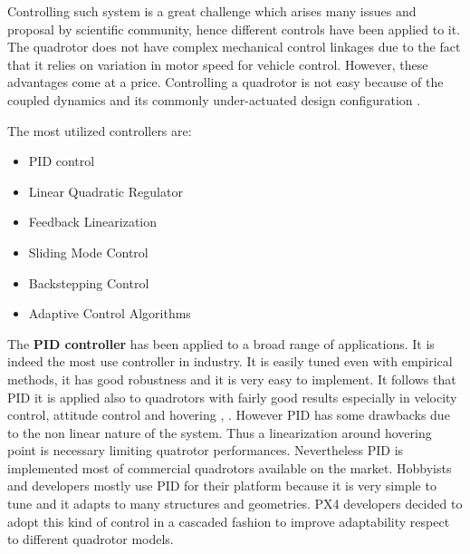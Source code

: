 \noindent
Controlling such system is a great challenge which arises many issues and proposal by scientific community, hence different controls have been applied to it. The quadrotor does not have complex mechanical control linkages due to the fact that it relies on variation in motor speed for vehicle control. However, these advantages come at a price. Controlling a quadrotor is not easy because of the coupled dynamics and its commonly under-actuated design configuration \cite{Algorithms2014}.
\par The most utilized controllers are: \begin{itemize}
\item PID control
\item Linear Quadratic Regulator
\item Feedback Linearization
\item Sliding Mode Control
\item Backstepping Control
\item Adaptive Control Algorithms
\end{itemize}
The \textbf{PID controller} has been applied to a broad range of applications. It is indeed the most use controller in industry. It is easily tuned even with empirical methods, it has good robustness and it is very easy to implement. It follows that PID it is applied also to quadrotors with fairly good results  especially in velocity control, attitude control and hovering \cite{Mahony2012}, \cite{Erginer2007}. However PID has some drawbacks due to the non linear nature of the system. Thus a linearization around hovering point is necessary \cite{Bouabdallah2} limiting quatrotor performances. Nevertheless PID is implemented most of commercial quadrotors available on the market. Hobbyists and developers mostly use PID for their platform because it is very simple to tune and it adapts to many structures and geometries. PX4 developers decided to adopt this kind of control in a cascaded fashion to improve adaptability respect to different quadrotor models. \par
\noindent
